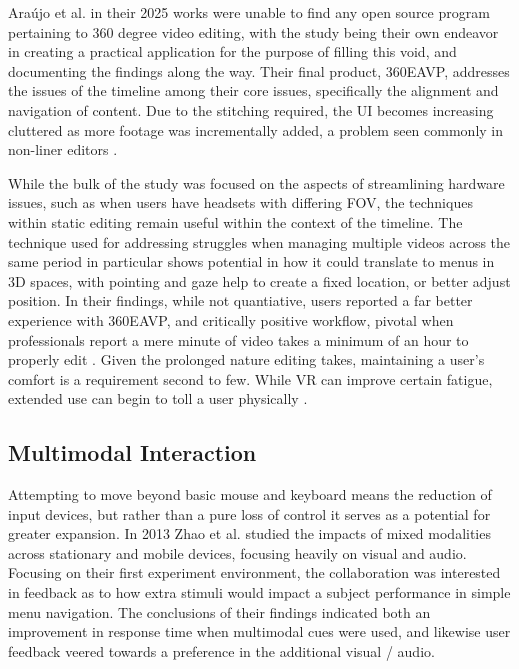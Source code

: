 \documentclass[manuscript, review]{acmart}
\begin{document}
Araújo et al. \cite{deCastroAraujoGabriel2025A3VP} in their 2025 works were unable to find any open source program pertaining to 360 degree video editing, with the study being their own endeavor in creating a practical application for the purpose of filling this void, and documenting the findings along the way. Their final product, 360EAVP, addresses the issues of the timeline among their core issues, specifically the alignment and navigation of content. Due to the stitching required, the UI becomes increasing cluttered as more footage was incrementally added, a problem seen commonly in non-liner editors \cite{GriffinRuairi202166DI}.

While the bulk of the study was focused on the aspects of streamlining hardware issues, such as when users have headsets with differing FOV, the techniques within static editing remain useful within the context of the timeline. The technique used for addressing struggles when managing multiple videos across the same period in particular shows potential in how it could translate to menus in 3D spaces, with pointing and gaze help to create a fixed location, or better adjust position. In their findings, while not quantiative, users reported a far better experience with 360EAVP, and critically positive workflow,  pivotal when professionals report a mere minute of video takes a minimum of an hour to properly edit \cite{RickyTelg2021VE}. Given the prolonged nature editing takes, maintaining a user’s comfort is a requirement second to few. While VR can improve certain fatigue, extended use can begin to toll a user physically \cite{10918867}.

\subsection{Multimodal Interaction}

Attempting to move beyond basic mouse and keyboard means the reduction of input devices, but rather than a pure loss of control it serves as a potential for greater expansion. In 2013 Zhao et al. \cite{ZhaoShengdong2013SIMM} studied the impacts of mixed modalities across stationary and mobile devices, focusing heavily on visual and audio. Focusing on their first experiment environment, the collaboration was interested in feedback as to how extra stimuli would impact a subject performance in simple menu navigation. The conclusions of their findings indicated both an improvement in response time when multimodal cues were used, and likewise user feedback veered towards a preference in the additional visual / audio.
\end{document}
